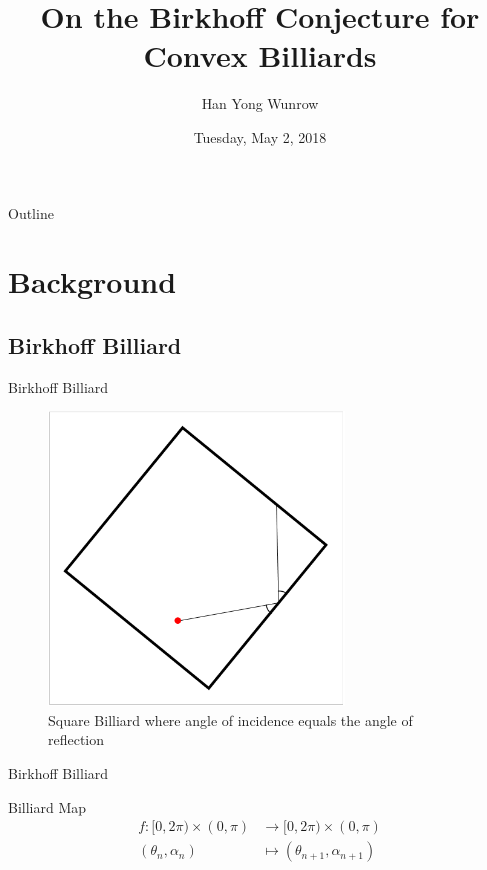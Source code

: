 \documentclass{beamer}
\title{On the Birkhoff Conjecture for Convex Billiards}
\author{Han Yong Wunrow\inst{1}}
\institute[Universities of Somewhere and Elsewhere] %
{
  \inst{1}%
  Undergraduate Department of Mathematics \\
  University of Minnesota - Twin Cities
}
\date{Tuesday, May 2, 2018}
\begin{document}
\begin{frame}
  \titlepage
\end{frame}

\begin{frame}{Outline}
  \tableofcontents
\end{frame}

\section{Background}

\subsection{Birkhoff Billiard}

\begin{frame}{Birkhoff Billiard}
  \begin{figure}
    \centering
    \includegraphics[width = 0.7\textwidth]{CongruentAngles}
    \caption{Square Billiard where angle of incidence equals the angle of reflection}
  \end{figure}
\end{frame}



\begin{frame}{Birkhoff Billiard}
    \begin{block}{Billiard Map}
        \begin{align*}
             f: [0, 2\pi) \times (0,\pi) &\rightarrow [0, 2\pi) \times (0,\pi) \\
             (\theta_n,\alpha_n) &\mapsto (\theta_{n+1},\alpha_{n+1})
        \end{align*}
    \end{block}
\end{frame}
\end{document}
